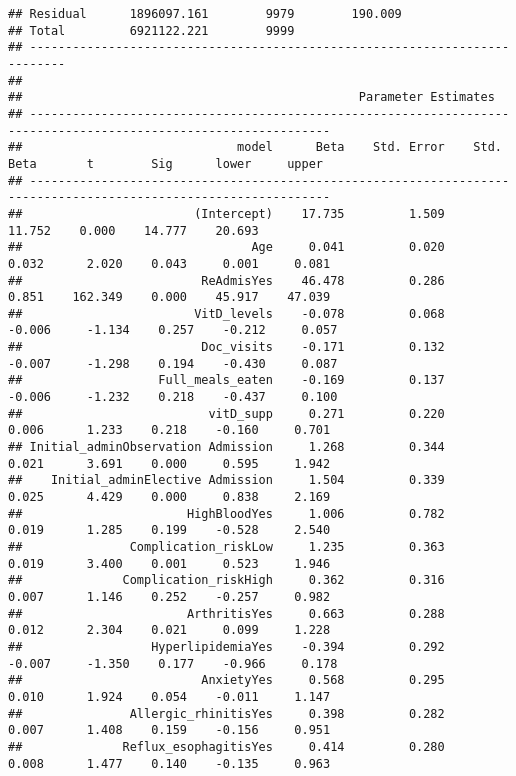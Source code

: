 \documentclass[
]{article}
\begin{document}
\begin{verbatim}
## Residual      1896097.161        9979        190.009                       
## Total         6921122.221        9999                                      
## ---------------------------------------------------------------------------
## 
##                                               Parameter Estimates                                                
## ----------------------------------------------------------------------------------------------------------------
##                              model      Beta    Std. Error    Std. Beta       t        Sig      lower     upper 
## ----------------------------------------------------------------------------------------------------------------
##                        (Intercept)    17.735         1.509                  11.752    0.000    14.777    20.693 
##                                Age     0.041         0.020        0.032      2.020    0.043     0.001     0.081 
##                         ReAdmisYes    46.478         0.286        0.851    162.349    0.000    45.917    47.039 
##                        VitD_levels    -0.078         0.068       -0.006     -1.134    0.257    -0.212     0.057 
##                         Doc_visits    -0.171         0.132       -0.007     -1.298    0.194    -0.430     0.087 
##                   Full_meals_eaten    -0.169         0.137       -0.006     -1.232    0.218    -0.437     0.100 
##                          vitD_supp     0.271         0.220        0.006      1.233    0.218    -0.160     0.701 
## Initial_adminObservation Admission     1.268         0.344        0.021      3.691    0.000     0.595     1.942 
##    Initial_adminElective Admission     1.504         0.339        0.025      4.429    0.000     0.838     2.169 
##                       HighBloodYes     1.006         0.782        0.019      1.285    0.199    -0.528     2.540 
##               Complication_riskLow     1.235         0.363        0.019      3.400    0.001     0.523     1.946 
##              Complication_riskHigh     0.362         0.316        0.007      1.146    0.252    -0.257     0.982 
##                       ArthritisYes     0.663         0.288        0.012      2.304    0.021     0.099     1.228 
##                  HyperlipidemiaYes    -0.394         0.292       -0.007     -1.350    0.177    -0.966     0.178 
##                         AnxietyYes     0.568         0.295        0.010      1.924    0.054    -0.011     1.147 
##               Allergic_rhinitisYes     0.398         0.282        0.007      1.408    0.159    -0.156     0.951 
##              Reflux_esophagitisYes     0.414         0.280        0.008      1.477    0.140    -0.135     0.963 

\end{verbatim}
\end{document}
